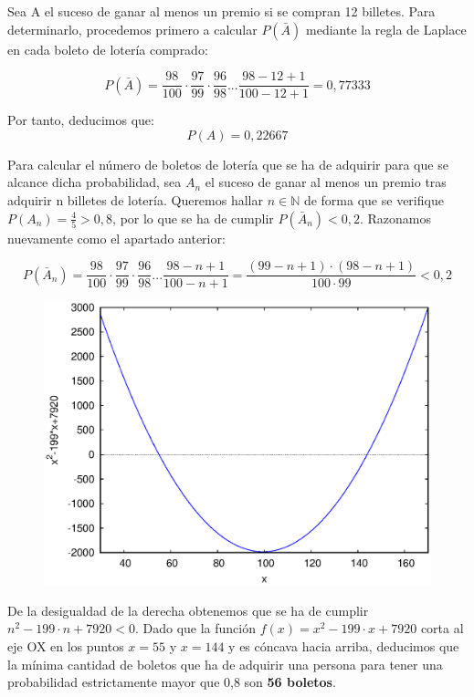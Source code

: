 \problem

\subproblem
Sea A el suceso de ganar al menos un premio si se compran 12 billetes. Para determinarlo, procedemos primero a calcular $P(\bar A)$ mediante la regla de Laplace en cada boleto de lotería comprado:
	
	$$
		P(\bar A) = \frac{98}{100}·\frac{97}{99}·\frac{96}{98}...\frac{98-12+1}{100-12+1} = 0,77333
	$$
	
	Por tanto, deducimos que: 
	$$
	 P(A) = 0,22667 
	$$
	
	\subproblem
	
	Para calcular el número de boletos de lotería que se ha de adquirir para que se alcance dicha probabilidad, sea $A_n$ el suceso de ganar al menos un premio tras adquirir n billetes de lotería. Queremos hallar $n \in \mathbb{N}$ de forma que se verifique $P(A_n) = \frac{4}{5} > 0,8$, por lo que 
	se ha de cumplir $P(\bar A_n) < 0,2$. Razonamos nuevamente como el apartado anterior:
	
	$$
	P(\bar A_n) = \frac{98}{100}·\frac{97}{99}·\frac{96}{98}...\frac{98-n+1}{100-n+1} = \frac{(99-n+1)·(98-n+1)}{100·99} < 0,2
	$$

	\begin{figure}[h]
		\centering
		\includegraphics[scale=0.40]{ejercicio-6-grafica.eps}
	\end{figure}
	
		
	
	De la desigualdad de la derecha obtenemos que se ha de cumplir $n^2 -199·n + 7920 < 0$. Dado que la función $f(x) = x^2 -199·x + 7920$ corta al eje OX en los puntos $x=55$ y $x=144$ y es cóncava hacia arriba, deducimos que la mínima cantidad de boletos que ha de adquirir una persona para tener una probabilidad estrictamente mayor que 0,8 son \textbf{56 boletos}.